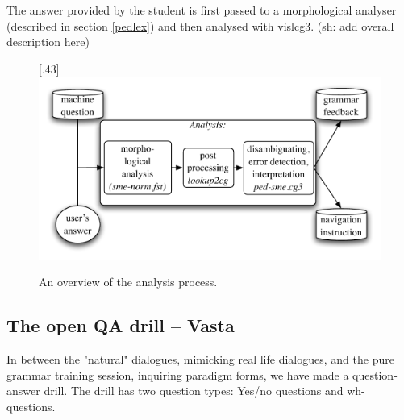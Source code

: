 \documentclass[11pt]{article}
\begin{document}
The answer provided by the student is first passed to a morphological analyser (described in section \ref{pedlex}) and then analysed with vislcg3. (sh: add overall description here)

\begin{figure}[htbp]
\begin{center}
\scalebox{.48}[.43]{\includegraphics{presentation/img/qa2.pdf}}
\caption{An overview of the analysis process.}
\label{qasystem}
\end{center}
\end{figure}





\subsection{The open QA drill -- Vasta}
In between the "natural" dialogues, mimicking real life dialogues, and the pure grammar training session, inquiring paradigm forms, we have made  a question-answer drill. The drill has two question types: Yes/no questions and wh-questions. 
\end{document}
